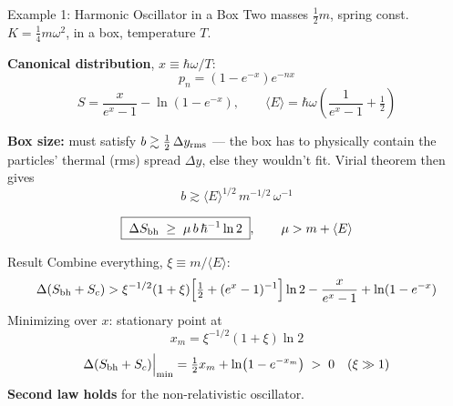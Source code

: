\documentclass[aspectratio=169]{beamer}
\begin{document}
\begin{frame}{Example 1: Harmonic Oscillator in a Box}
Two masses $\tfrac12 m$, spring const.\ $K=\tfrac14 m\omega^2$, in a box, temperature $T$.

\vspace{0.2cm}
\textbf{Canonical distribution}, $x\equiv\hbar\omega/T$:
\[
p_n=(1-e^{-x})e^{-nx}
\]
\[
S = \frac{x}{e^x-1} - \ln(1-e^{-x}),
\qquad
\langle E\rangle = \hbar\omega\left(\frac{1}{e^x-1}+\tfrac12\right)
\]

\vspace{0.15cm}
\textbf{Box size:} must satisfy $b \gtrsim \tfrac12\,\Delta y_{\rm rms}$ — the box has to physically contain the particles' thermal (rms) spread $\Delta y$, else they wouldn't fit. Virial theorem then gives
\[
b \gtrsim \langle E\rangle^{1/2}\,m^{-1/2}\,\omega^{-1}
\]


\begin{center}
\[
\boxed{\;\Delta S_{\rm bh} \;\ge\; \mu\, b\,\hbar^{-1}\ln 2\;}, \qquad \mu > m+\langle E\rangle
\]
\end{center}
\vspace{0.1cm}
\end{frame}

\begin{frame}{Result}
Combine everything, $\xi \equiv m/\langle E\rangle$:
\[
\Delta(S_{\rm bh}+S_c) > \xi^{-1/2}(1+\xi)\Big[\tfrac12+(e^x-1)^{-1}\Big]\ln2 - \frac{x}{e^x-1}+\ln(1-e^{-x})
\]
Minimizing over $x$: stationary point at
\[
x_m = \xi^{-1/2}(1+\xi)\ln 2
\]
\[
\Delta(S_{\rm bh}+S_c)\Big|_{\min} = \tfrac12 x_m + \ln\!\big(1-e^{-x_m}\big) \; > \;0 \quad (\xi \gg 1)
\]
\centering
\textbf{Second law holds} for the non-relativistic oscillator.
\end{frame}
\end{document}
